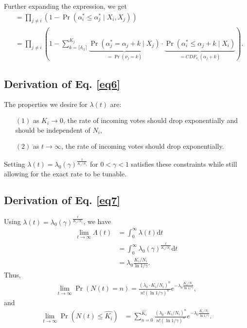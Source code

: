 \documentclass[chi_draft]{sigchi}
\begin{document}
Further expanding the expression, we get
\begin{align*}
&= \prod_{j \neq i} \left( 1 - \Pr(\alpha^*_i \leq \alpha^*_j \mid X_i, X_j) \right)\\
&= \prod_{j \neq i} \left( 1 - \sum_{k=\lceil\delta_{ij}\rceil}^{K_j} \underbrace{\Pr(\alpha^*_j = \alpha_j + k \mid X_j)}_{= \Pr(\nu_j = k)} \cdot \underbrace{\Pr(\alpha^*_i \leq \alpha_j + k \mid X_i)}_{={CDF}_{\nu_i}(\alpha_j + k)} \right).
\end{align*}

\subsection{Derivation of Eq. \eqref{eq6}}
The properties we desire for $\lambda(t)$ are:
\begin{description}
\begin{itemize}
\item[$(1)$] as $K_i \rightarrow 0$, the rate of incoming votes should drop exponentially and should be independent of $N_i$,
\item[$(2)$] as $t \rightarrow \infty$, the rate of incoming votes should drop exponentially.
\end{itemize} 
\end{description}
Setting $\lambda (t) = \lambda_0 {(\gamma)}^{\frac{t}{K_i/N_i}}$ for $0 < \gamma < 1$ satisfies these constraints while still allowing for the exact rate to be tunable.

\subsection{Derivation of Eq. \eqref{eq7}}
Using $\lambda (t) = \lambda_0 {(\gamma)}^{\frac{t}{K_i/N_i}}$, we have
\begin{align*}
\lim_{t \rightarrow \infty} \Lambda (t) &=\int _{0}^{\infty}\lambda (t)\mathrm{d}t\\
&= \int _{0}^{\infty} \lambda_0 {(\gamma)}^{\frac{t}{K_i/N_i}} \mathrm{d}t\\
&= \lambda_0 \frac{K_i/N_i}{\ln{1/\gamma}}.
\end{align*}
Thus, 
\begin{align*}
\lim_{t\rightarrow \infty}\Pr\left(N(t) = n\right) = \frac{(\lambda_0 \cdot K_i/N_i)^n}{n!(\ln{1/\gamma})^n}e^{-\lambda_0 \frac{K_i/N_i}{\ln{1/\gamma}}},
\end{align*}
and
\begin{align*}
\lim_{t\rightarrow \infty}\Pr\left(N(t)\leq \hat{K_i}\right) & = \sum_{n=0}^{\hat{K_i}} \frac{(\lambda_0 \cdot K_i/N_i)^n}{n!(\ln{1/\gamma})^n}e^{-\lambda_0 \frac{K_i/N_i}{\ln{1/\gamma}}}.
\end{align*}
\end{document}
